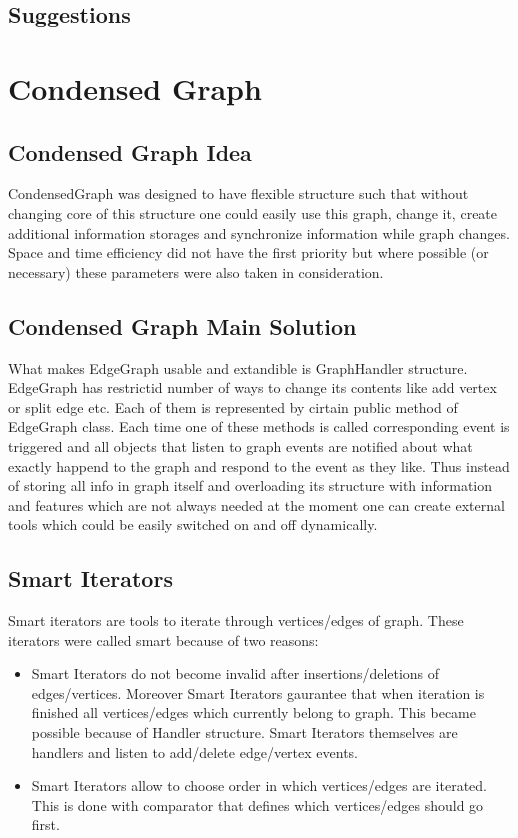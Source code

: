 \documentclass[14pt]{article}
\begin{document}
\subsection{Suggestions}

\section{Condensed Graph}
\subsection{Condensed Graph Idea}

CondensedGraph was designed to have flexible structure such that without changing core of this structure one could easily use this graph, change it, create additional information storages and synchronize information while graph changes. Space and time efficiency did not have the first priority but where possible (or necessary) these parameters were also taken in consideration.

\subsection{Condensed Graph Main Solution}

What makes EdgeGraph usable and extandible is GraphHandler structure. EdgeGraph has restrictid number of ways to change its contents like add vertex or split edge etc. Each of them is represented by cirtain public method of EdgeGraph class. Each time one of these methods is called corresponding event is triggered and all objects that listen to graph events are notified about what exactly happend to the graph and respond to the event as they like. Thus instead of storing all info in graph itself and overloading its structure with information and features which are not always needed at the moment one can create external tools which could be easily switched on and off dynamically.

\subsection{Smart Iterators}

Smart iterators are tools to iterate through vertices/edges of graph. These iterators were called smart because of two reasons:
\begin{itemize}
\item Smart Iterators do not become invalid after insertions/deletions of edges/vertices. Moreover Smart Iterators gaurantee that when iteration is finished all vertices/edges which currently belong to graph. This became possible because of Handler structure. Smart Iterators themselves are handlers and listen to add/delete edge/vertex events.
\item Smart Iterators allow to choose order in which vertices/edges are iterated. This is done with comparator that defines which vertices/edges should go first.
\end{itemize}
\end{document}
